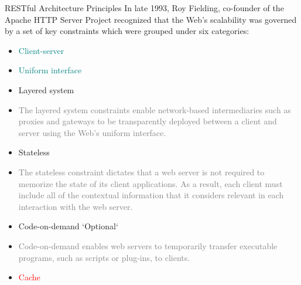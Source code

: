 \documentclass{beamer}
\begin{document}
\begin{frame}[t]{RESTful Architecture Principles}
	\scriptsize
	In late 1993, Roy Fielding, co-founder of the Apache HTTP Server Project recognized that the Web’s scalability was governed by a set of key constraints which were grouped under six categories:
	\begin{itemize}
    	\item \textcolor{teal}{Client-server}
    	\item \textcolor{teal}{Uniform interface}

    	\item Layered system
    	
    	\item[] \textcolor{gray}{\tiny The layered system constraints enable network-based intermediaries such as proxies and gateways to be transparently deployed between a client and server using the Web’s uniform interface.} 
    	
    	\item Stateless
    	\item[] \textcolor{gray}{ \tiny The stateless constraint dictates that a web server is not required to memorize the state of its client applications. As a result, each client must include all of the contextual information that it considers relevant in each interaction with the web server. }
    	
    	\item Code-on-demand `Optional`
    	\item[] \textcolor{gray}{\tiny Code-on-demand enables web servers to temporarily transfer executable programs, such as scripts or plug-ins, to clients.}

    	\item \textcolor{red} {Cache}
	\end{itemize}
\end{frame}
\end{document}
